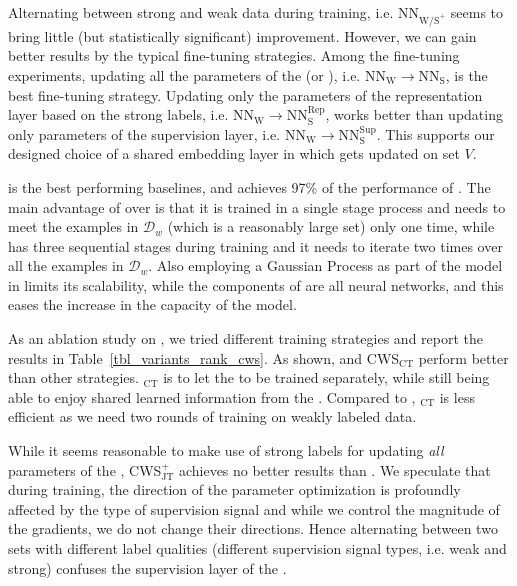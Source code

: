 Alternating between strong and weak data during training, i.e. $\text{NN}_{\text{W}\text{/S}^+}$ seems to bring little (but statistically significant) improvement. However, we can gain better results by the typical fine-tuning strategies.  Among the fine-tuning experiments, updating all the parameters of the \tnet (or \std), i.e. $\text{NN}_{\text{W}} \to \text{NN}_{\text{S}}$, is the best fine-tuning strategy. Updating only the parameters of the representation layer based on the strong labels, i.e. $\text{NN}_{\text{W}} \to \text{NN}^{\text{Rep}}_{\text{S}}$, works better than updating only parameters of the supervision layer, i.e. $\text{NN}_{\text{W}} \to \text{NN}^{\text{Sup}}_{\text{S}}$. This supports our designed choice of a shared embedding layer in \cws which gets updated on set $V$.

\fwl is the best performing baselines, and \cws achieves 97\% of the performance of \fwl. The main advantage of \cws over \fwl is that it is trained in a single stage process and needs to meet the examples in $\mathcal{D}_w$ (which is a reasonably large set) only one time, while \fwl has three sequential stages during training and it needs to iterate two times over all the examples in $\mathcal{D}_w$. Also employing a Gaussian Process as part of the model in \fwl limits its scalability, while the components of \cws are all neural networks, and this eases the increase in the capacity of the model. 



As an ablation study on \cws, we tried different training strategies and report the results in Table~\ref{tbl_variants_rank_cws}. As shown, \cws and CWS$_\text{CT}$ perform better than other strategies.
%
\cws$_\text{CT}$ is to let the \cnet to be trained separately, while still being able to enjoy shared learned information from the \tnet. Compared to \cws, \cws$_\text{CT}$ is less efficient as we need two rounds of training on weakly labeled data. 

While it seems reasonable to make use of strong labels for updating \emph{all} parameters of the \tnet, CWS$_\text{JT}^+$ achieves no better results than \cws. We speculate that during training, the direction of the parameter optimization is profoundly affected by the type of supervision signal and while we control the magnitude of the gradients, we do not change their directions. Hence alternating between two sets with different label qualities (different supervision signal types, i.e. weak and strong) confuses the supervision layer of the \tnet. 


